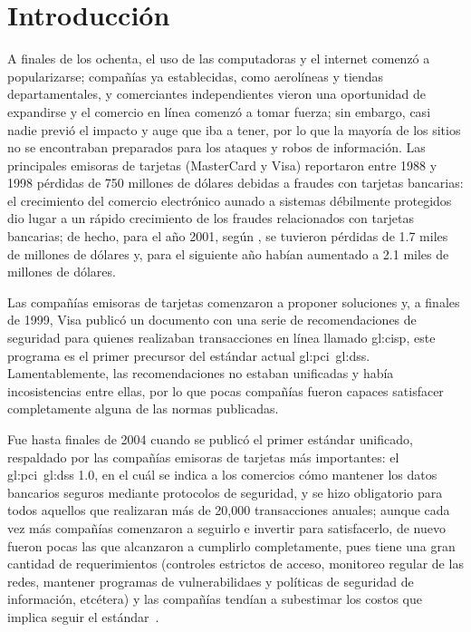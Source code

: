 %
%
%

\chapter{Introducción}

A finales de los ochenta, el uso de las computadoras y el internet comenzó a
popularizarse; compañías ya establecidas, como aerolíneas y tiendas
departamentales, y comerciantes independientes vieron una oportunidad de
expandirse y el comercio en línea comenzó a tomar fuerza; sin embargo, casi
nadie previó el impacto y auge que iba a tener, por lo que la mayoría de los
sitios no se encontraban preparados para los ataques y robos de información.
Las principales emisoras de tarjetas (MasterCard y Visa) reportaron entre 1988 y
1998 pérdidas de 750 millones de dólares debidas a fraudes con
tarjetas bancarias: el crecimiento del comercio electrónico aunado a
sistemas débilmente protegidos dio lugar a un rápido crecimiento de los
fraudes relacionados con tarjetas bancarias; de hecho, para el año 2001,
según \cite{wallethub}, se tuvieron pérdidas de 1.7 miles de millones de
dólares y, para el siguiente año habían aumentado a 2.1 miles de millones de
dólares.

Las compañías emisoras de tarjetas comenzaron a proponer soluciones y,
a finales de 1999, Visa publicó un documento con una serie de recomendaciones
de seguridad para quienes realizaban transacciones en línea llamado
\gls{gl:cisp}, este programa es el primer precursor del estándar actual
\gls{gl:pci}~\gls{gl:dss}. Lamentablemente, las recomendaciones no estaban
unificadas y había incosistencias entre ellas, por lo que pocas compañías
fueron capaces satisfacer completamente alguna de las normas publicadas.

Fue hasta finales de 2004 cuando se publicó el primer estándar unificado,
respaldado por las compañías emisoras de tarjetas más importantes: el
\gls{gl:pci}~\gls{gl:dss} 1.0, en el cuál se indica a los comercios cómo
mantener los datos bancarios seguros mediante protocolos de seguridad, y se hizo
obligatorio para todos aquellos que realizaran más de 20,000 transacciones
anuales; aunque cada vez más compañías comenzaron a seguirlo e invertir para
satisfacerlo, de nuevo fueron pocas las que alcanzaron a cumplirlo
completamente, pues tiene una gran cantidad de requerimientos (controles
estrictos de acceso, monitoreo regular de las redes, mantener programas de
vulnerabilidaes y políticas de seguridad de información, etcétera) y las
compañías tendían a subestimar los costos que implica seguir el
estándar~\cite{uk_association, search_security}.

